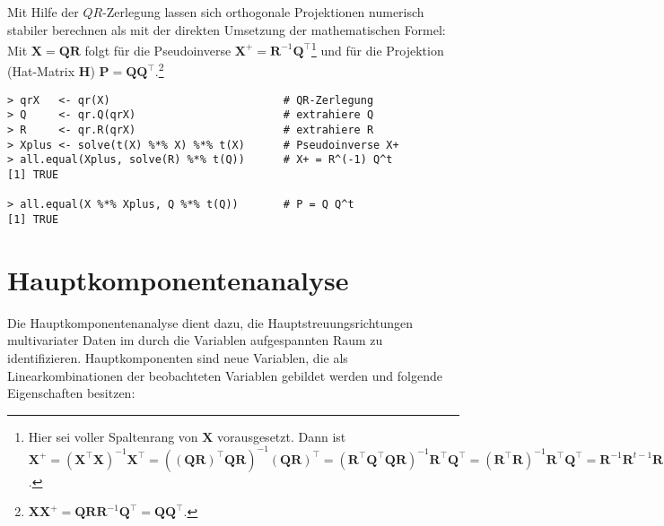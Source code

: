 Mit Hilfe der $QR$-Zerlegung lassen sich orthogonale Projektionen numerisch stabiler berechnen als mit der direkten Umsetzung der mathematischen Formel: Mit $\bm{X} = \bm{Q} \bm{R}$ folgt für die Pseudoinverse $\bm{X}^{+} = \bm{R}^{-1} \bm{Q}^{\top}$\footnote{Hier sei voller Spaltenrang von $\bm{X}$ vorausgesetzt. Dann ist $\bm{X}^{+} = (\bm{X}^{\top} \bm{X})^{-1} \bm{X}^{\top} = ((\bm{Q} \bm{R})^{\top} \bm{Q} \bm{R})^{-1} (\bm{Q} \bm{R})^{\top} = (\bm{R}^{\top} \bm{Q}^{\top} \bm{Q} \bm{R})^{-1} \bm{R}^{\top} \bm{Q}^{\top} = (\bm{R}^{\top} \bm{R})^{-1} \bm{R}^{\top} \bm{Q}^{\top} = \bm{R}^{-1} \bm{R}^{t -1} \bm{R}^{\top} \bm{Q}^{\top} = \bm{R}^{-1} \bm{Q}^{\top}$.} und für die Projektion (Hat-Matrix $\bm{H}$) $\bm{P} = \bm{Q} \bm{Q}^{\top}$.\footnote{$\bm{X} \bm{X}^{+} = \bm{Q} \bm{R} \bm{R}^{-1} \bm{Q}^{\top} = \bm{Q} \bm{Q}^{\top}$.}
\begin{lstlisting}
> qrX   <- qr(X)                           # QR-Zerlegung
> Q     <- qr.Q(qrX)                       # extrahiere Q
> R     <- qr.R(qrX)                       # extrahiere R
> Xplus <- solve(t(X) %*% X) %*% t(X)      # Pseudoinverse X+
> all.equal(Xplus, solve(R) %*% t(Q))      # X+ = R^(-1) Q^t
[1] TRUE

> all.equal(X %*% Xplus, Q %*% t(Q))       # P = Q Q^t
[1] TRUE
\end{lstlisting}

\section{Hauptkomponentenanalyse}
\label{sec:multPCA}

Die Hauptkomponentenanalyse dient dazu, die Hauptstreuungsrichtungen multivariater Daten im durch die Variablen aufgespannten Raum zu identifizieren. Hauptkomponenten sind neue Variablen, die als Linearkombinationen der beobachteten Variablen gebildet werden und folgende Eigenschaften besitzen:

